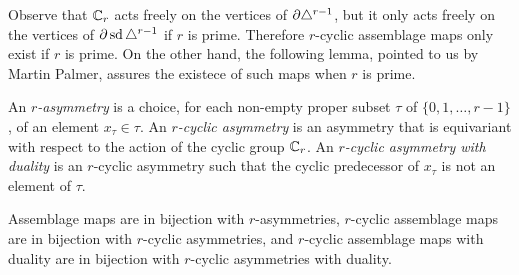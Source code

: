
Observe that $\mathbb{C}_r$ acts freely on the vertices of $\partial \triangle^{r-1}$, but it only acts freely on the vertices of $\partial \operatorname{sd}\triangle^{r-1}$ if $r$ is prime. Therefore $r$-cyclic assemblage maps only exist if $r$ is prime. On the other hand, the following lemma, pointed to us by Martin Palmer, assures the existece of such maps when $r$ is prime.

\begin{definition}
	An \emph{$r$-asymmetry} is a choice, for each non-empty proper subset $\tau$ of $\{0,1,\dots,r-1\}$, of an element $x_\tau\in \tau$. An \emph{$r$-cyclic asymmetry} is an asymmetry that is equivariant with respect to the action of the cyclic group $\mathbb{C}_r$. An \emph{$r$-cyclic asymmetry with duality} is an $r$-cyclic asymmetry such that the cyclic predecessor of $x_\tau$ is not an element of $\tau$.
\end{definition}

\begin{lemma}\label{lemma:asymmetry}
	Assemblage maps are in bijection with $r$-asymmetries, $r$-cyclic assemblage maps are in bijection with $r$-cyclic asymmetries, and $r$-cyclic assemblage maps with duality are in bijection with $r$-cyclic asymmetries with duality.
\end{lemma}

